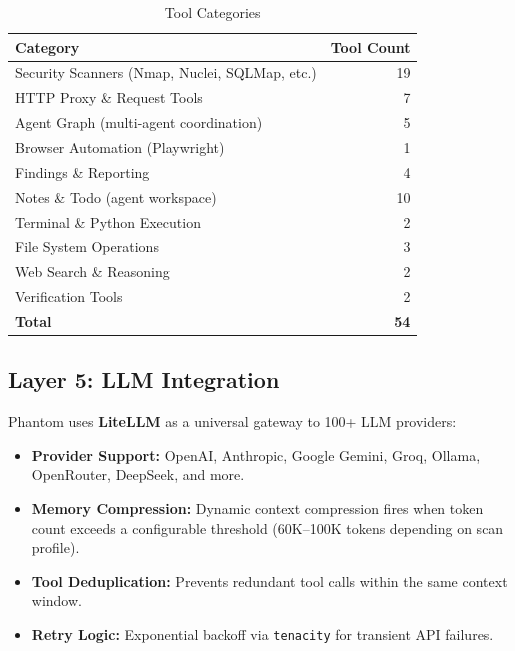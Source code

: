 \documentclass[12pt,a4paper]{article}
\begin{document}
\begin{table}[H]
\centering
\begin{tabular}{lr}
\toprule
\textbf{Category} & \textbf{Tool Count} \\
\midrule
Security Scanners (Nmap, Nuclei, SQLMap, etc.) & 19 \\
HTTP Proxy \& Request Tools                    & 7 \\
Agent Graph (multi-agent coordination)         & 5 \\
Browser Automation (Playwright)                & 1 \\
Findings \& Reporting                          & 4 \\
Notes \& Todo (agent workspace)                & 10 \\
Terminal \& Python Execution                   & 2 \\
File System Operations                         & 3 \\
Web Search \& Reasoning                        & 2 \\
Verification Tools                             & 2 \\
\midrule
\textbf{Total}                                 & \textbf{54} \\
\bottomrule
\end{tabular}
\caption{Tool Categories}
\end{table}

\subsection{Layer 5: LLM Integration}

Phantom uses \textbf{LiteLLM} as a universal gateway to 100+ LLM providers:

\begin{itemize}
    \item \textbf{Provider Support:} OpenAI, Anthropic, Google Gemini, Groq,
          Ollama, OpenRouter, DeepSeek, and more.
    \item \textbf{Memory Compression:} Dynamic context compression fires when
          token count exceeds a configurable threshold (60K--100K tokens
          depending on scan profile).
    \item \textbf{Tool Deduplication:} Prevents redundant tool calls within
          the same context window.
    \item \textbf{Retry Logic:} Exponential backoff via \texttt{tenacity}
          for transient API failures.
\end{itemize}
\end{document}
